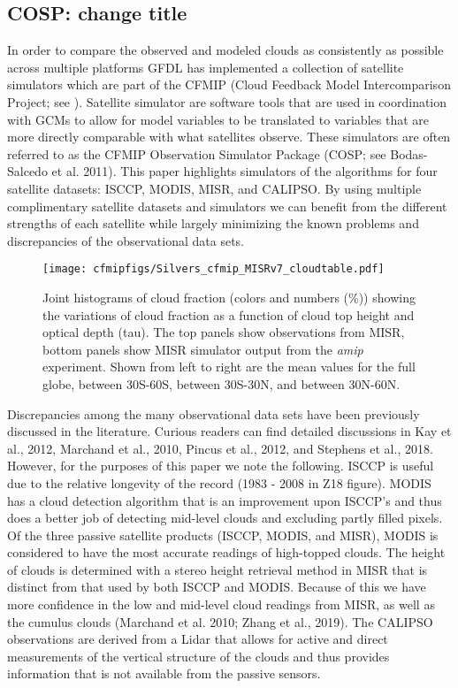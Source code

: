 \documentclass[draft]{agujournal2019}
\begin{document}
\subsection{COSP: change title}
In order to compare the observed and modeled clouds as consistently as possible across multiple platforms 
GFDL has implemented a collection of satellite simulators which are part of the 
CFMIP (Cloud Feedback Model Intercomparison Project; see \cite{Webb_etal_2017}).  Satellite simulator
are software tools that are used in coordination with GCMs to allow for model variables 
to be translated to variables that are more directly comparable with what satellites observe.  
These simulators are often referred to as the CFMIP Observation Simulator Package (COSP; see Bodas-Salcedo et al. 2011).  
This paper highlights simulators of the algorithms for 
four satellite datasets: ISCCP, 
MODIS, 
MISR, and 
CALIPSO.  By using multiple complimentary satellite 
datasets and simulators we can benefit from the different strengths of each satellite while largely 
minimizing the known problems and discrepancies of the observational data sets.      

\begin{figure}
  \centering
  \texttt{[image: cfmipfigs/Silvers\_cfmip\_MISRv7\_cloudtable.pdf]}
  \caption{Joint histograms of cloud fraction (colors and numbers (\%)) showing the variations of cloud fraction 
  as a function of cloud top height and optical depth (tau).
  The top panels show observations from MISR, bottom panels show MISR simulator output from the 
  \textit{amip} experiment.  Shown from left to right are the mean values for the full globe, between 30S-60S,
  between 30S-30N, and between 30N-60N.}
  \label{fig:misr_sim_vs_mod}
\end{figure}

Discrepancies among the many observational data sets have been previously discussed in the literature.
Curious readers can find detailed discussions in Kay et al., 2012,
Marchand et al., 2010, Pincus et al., 2012, and Stephens et al., 2018.  However, for the 
purposes of this paper we note the following.  ISCCP is useful due to 
the relative longevity of the record (1983 - 2008 in Z18 figure). 
MODIS has a cloud detection algorithm that is an improvement upon ISCCP's and
thus does a better job of detecting mid-level clouds and excluding partly filled pixels.   
Of the three passive satellite products (ISCCP, MODIS, and MISR), MODIS is considered to have the most 
accurate readings of high-topped clouds.  The height of clouds is determined with a stereo height retrieval 
method in MISR that is distinct from that used by both ISCCP and MODIS.  Because of this we have more 
confidence in the low and mid-level cloud readings 
from MISR, as well as the cumulus clouds (Marchand et al. 2010; Zhang et al., 2019).   The CALIPSO observations
are derived from a Lidar that allows for active and direct measurements of the vertical structure of the clouds and thus 
provides information that is not available from the passive sensors.  
\end{document}
